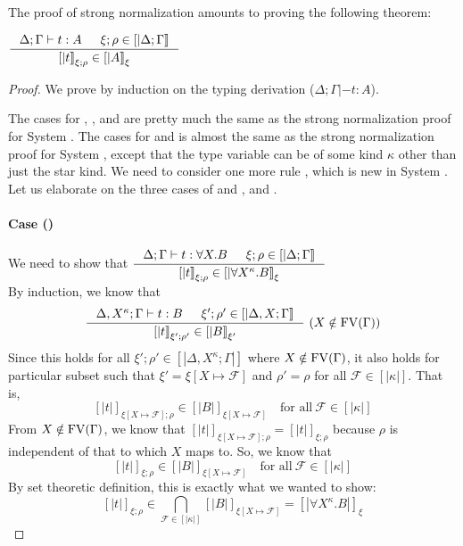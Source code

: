 The proof of strong normalization amounts to proving the following theorem:
\begin{theorem}
$ \inference{\Delta;\Gamma|- t:A & \xi;\rho \in [|\Delta;\Gamma|]}
            {[|t|]_{\xi;\rho} \in [|A|]_\xi} $
\end{theorem}
\begin{proof}
We prove by induction on the typing derivation ($\Delta;\Gamma |- t:A$).

The cases for , , and  are pretty
much the same as the strong normalization proof for System \F.
The cases for  and  is almost the same
as the strong normalization proof for System \F, except that the type variable
can be of some kind $\kappa$ other than just the star kind.
We need to consider one more rule , which is new in System \Fw.
Let us elaborate on the three cases of
 and , and .

\paragraph{Case ()}
We need to show that
$ \inference{\Delta;\Gamma |- t : \forall X.B & \xi;\rho\in[|\Delta;\Gamma|]}
        {[|t|]_{\xi;\rho} \in [|\forall X^\kappa.B|]_\xi} $ \\
By induction, we know that
\[ \inference{\Delta,X^\kappa;\Gamma |- t:B & \xi';\rho'\in[|\Delta,X;\Gamma|]}
        {[|t|]_{\xi';\rho'} \in [|B|]_{\xi'}} ~
        (X\notin\FV(\Gamma))
\]
Since this holds for all $\xi';\rho' \in [|\Delta,X^\kappa;\Gamma|]$ where
$X\notin\mathop{\mathrm{FV}}(\Gamma)$, it also holds for particular subset such that
$\xi' = \xi[X\mapsto\mathcal{F}]$ and $\rho'=\rho$ for all $\mathcal{F}\in[|\kappa|]$.
That is,
\[ [|t|]_{\xi[X\mapsto\mathcal{F}];\rho} \in [|B|]_{\xi[X\mapsto\mathcal{F}]}
        \quad \text{for all}~\mathcal{F}\in[|\kappa|] \]
From $X\notin\mathop{\mathrm{FV}}(\Gamma)$, we know that
$[|t|]_{\xi[X\mapsto\mathcal{F}];\rho} = [|t|]_{\xi;\rho}$
because $\rho$ is independent of that to which $X$ maps to.
So, we know that
\[ [|t|]_{\xi;\rho} \in [|B|]_{\xi[X\mapsto\mathcal{F}]}
        \quad \text{for all}~\mathcal{F}\in[|\kappa|] \]
By set theoretic definition, this is exactly what we wanted to show:
\[ [|t|]_{\xi;\rho} \in
        \bigcap_{\mathcal{F}\in[|\kappa|]} [|B|]_{\xi[X\mapsto\mathcal{F}]}
        = [|\forall X^\kappa.B|]_\xi
\]


\end{proof}
